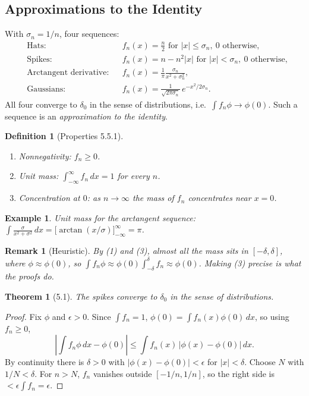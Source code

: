 \documentclass{article}
\newtheorem{theorem}{Theorem}
\newtheorem{definition}{Definition}
\newtheorem*{example}{Example}
\newtheorem{remark}{Remark}
\begin{document}
\subsection{Approximations to the Identity}
With $\sigma_n = 1/n$, four sequences:
\begin{align}
    &\text{Hats:} && f_n(x) = \tfrac{n}{2} \text{ for } |x| \leq \sigma_n,\ 0 \text{ otherwise}, \\
    &\text{Spikes:} && f_n(x) = n - n^2|x| \text{ for } |x| < \sigma_n,\ 0 \text{ otherwise}, \\
    &\text{Arctangent derivative:} && f_n(x) = \frac{1}{\pi}\frac{\sigma_n}{x^2 + \sigma_n^2}, \\
    &\text{Gaussians:} && f_n(x) = \frac{1}{\sqrt{2\pi\sigma_n}}\,e^{-x^2/2\sigma_n}.
\end{align}
All four converge to $\delta_0$ in the sense of distributions, i.e.\ $\int f_n\phi \to \phi(0)$. Such a sequence is an \emph{approximation to the identity}.
\begin{definition}[Properties 5.5.1]
    \begin{enumerate}[label=(\arabic*)]
        \item Nonnegativity: $f_n \geq 0$.
        \item Unit mass: $\int_{-\infty}^\infty f_n\,dx = 1$ for every $n$.
        \item Concentration at $0$: as $n \to \infty$ the mass of $f_n$ concentrates near $x = 0$.
    \end{enumerate}
\end{definition}
\begin{example}
    Unit mass for the arctangent sequence: $\int \frac{\sigma}{x^2+\sigma^2}\,dx = \big[\arctan(x/\sigma)\big]_{-\infty}^\infty = \pi$.
\end{example}
\begin{remark}[Heuristic]
    By (1) and (3), almost all the mass sits in $[-\delta,\delta]$, where $\phi \approx \phi(0)$, so $\int f_n\phi \approx \phi(0)\int_{-\delta}^{\delta} f_n \approx \phi(0)$. Making (3) precise is what the proofs do.
\end{remark}
\begin{theorem}[5.1]
    The spikes converge to $\delta_0$ in the sense of distributions.
\end{theorem}
\begin{proof}
    Fix $\phi$ and $\epsilon > 0$. Since $\int f_n = 1$, $\phi(0) = \int f_n(x)\phi(0)\,dx$, so using $f_n \geq 0$,
    \begin{equation}
        \left|\int f_n\phi\,dx - \phi(0)\right| \leq \int f_n(x)\,|\phi(x) - \phi(0)|\,dx.
    \end{equation}
    By continuity there is $\delta > 0$ with $|\phi(x) - \phi(0)| < \epsilon$ for $|x| < \delta$. Choose $N$ with $1/N < \delta$. For $n > N$, $f_n$ vanishes outside $[-1/n,1/n]$, so the right side is $< \epsilon\int f_n = \epsilon$.
\end{proof}
\end{document}
